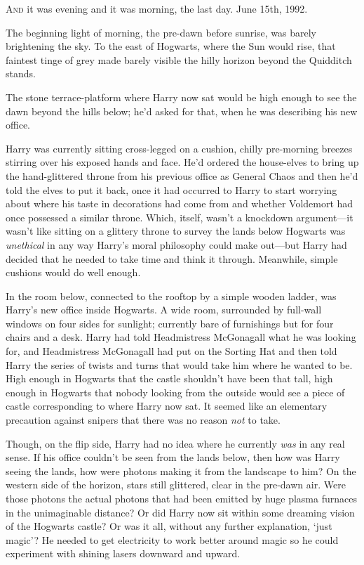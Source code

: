 
\lettrine{A}{nd} it was
evening and it was morning, the last day. June 15th, 1992.

The beginning light of morning, the pre-dawn before sunrise, was barely
brightening the sky. To the east of Hogwarts, where the Sun would rise, that
faintest tinge of grey made barely visible the hilly horizon beyond the
Quidditch stands.

The stone terrace-platform where Harry now sat would be high enough to see the
dawn beyond the hills below; he'd asked for that, when he was describing his
new office.

Harry was currently sitting cross-legged on a cushion, chilly pre-morning
breezes stirring over his exposed hands and face. He'd ordered the house-elves
to bring up the hand-glittered throne from his previous office as General
Chaos{\el} and then he'd told the elves to put it back, once it had occurred
to Harry to start worrying about where his taste in decorations had come from
and whether Voldemort had once possessed a similar throne. Which, itself,
wasn't a knockdown argument---it wasn't like sitting on a glittery throne to
survey the lands below Hogwarts was \emph{unethical} in any way Harry's moral
philosophy could make out---but Harry had decided that he needed to take time
and think it through. Meanwhile, simple cushions would do well enough.

In the room below, connected to the rooftop by a simple wooden ladder, was
Harry's new office inside Hogwarts. A wide room, surrounded by full-wall
windows on four sides for sunlight; currently bare of furnishings but for four
chairs and a desk. Harry had told Headmistress McGonagall what he was looking
for, and Headmistress McGonagall had put on the Sorting Hat and then told Harry
the series of twists and turns that would take him where he wanted to be. High
enough in Hogwarts that the castle shouldn't have been that tall, high enough
in Hogwarts that nobody looking from the outside would see a piece of castle
corresponding to where Harry now sat. It seemed like an elementary precaution
against snipers that there was no reason \emph{not} to take.

Though, on the flip side, Harry had no idea where he currently \emph{was} in
any real sense. If his office couldn't be seen from the lands below, then how
was Harry seeing the lands, how were photons making it from the landscape to
him? On the western side of the horizon, stars still glittered, clear in the
pre-dawn air. Were those photons the actual photons that had been emitted by
huge plasma furnaces in the unimaginable distance? Or did Harry now sit within
some dreaming vision of the Hogwarts castle? Or was it all, without any further
explanation, `just magic'? He needed to get electricity to work better around
magic so he could experiment with shining lasers downward and upward.

